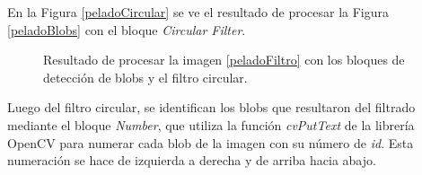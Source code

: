 En la Figura \ref{peladoCircular} se ve el resultado de procesar la Figura \ref{peladoBlobs} con el bloque \emph{Circular Filter}.

\begin{figure}[H]
       \hspace{-1cm}
        \hspace{3 mm}
  \caption{Resultado de procesar la imagen \ref{peladoFiltro} con los bloques de detección de blobs y el filtro circular.}
      \label{ejemplocircularfilter}
\end{figure}

Luego del filtro circular, se identifican los blobs que resultaron del filtrado mediante el bloque \emph{Number}, que utiliza la función \emph{cvPutText} de la librería  OpenCV para numerar cada blob de la imagen con su número de \textit{id}. Esta numeración se hace de izquierda a derecha y de arriba hacia abajo.\\


